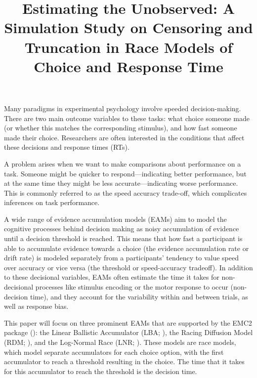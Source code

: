\documentclass[
  man,
  floatsintext,
  longtable,
  nolmodern,
  notxfonts,
  notimes,
  colorlinks=true,linkcolor=blue,citecolor=blue,urlcolor=blue]{apa7}
\title{Estimating the Unobserved: A Simulation Study on Censoring and
Truncation in Race Models of Choice and Response Time}
\begin{document}
\maketitle




\setlength\LTleft{0pt}




Many paradigms in experimental psychology involve speeded
decision-making. There are two main outcome variables to these tasks:
what choice someone made (or whether this matches the corresponding
stimulus), and how fast someone made their choice. Researchers are often
interested in the conditions that affect these decisions and response
times (RTs).

A problem arises when we want to make comparisons about performance on a
task. Someone might be quicker to respond---indicating better
performance, but at the same time they might be less
accurate---indicating worse performance. This is commonly referred to as
the speed accuracy trade-off, which complicates inferences on task
performance.

A wide range of evidence accumulation models (EAMs) aim to model the
cognitive processes behind decision making as noisy accumulation of
evidence until a decision threshold is reached. This means that how fast
a participant is able to accumulate evidence towards a choice (the
evidence accumulation rate or drift rate) is modeled separately from a
participants' tendency to value speed over accuracy or vice versa (the
threshold or speed-accuracy tradeoff). In addition to these decisional
variables, EAMs often estimate the time it takes for non-decisional
processes like stimulus encoding or the motor response to occur
(non-decision time), and they account for the variability within and
between trials, as well as response bias.

This paper will focus on three prominent EAMs that are supported by the
EMC2 package (): the Linear
Ballistic Accumulator (LBA; ), the Racing Diffusion Model (RDM; ), and the Log-Normal Race (LNR; ). These models are race models, which model separate
accumulators for each choice option, with the first accumulator to reach
a threshold resulting in the choice. The time that it takes for this
accumulator to reach the threshold is the decision time.
\end{document}
